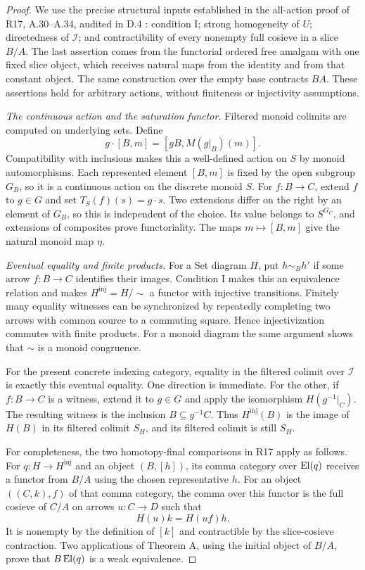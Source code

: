 \begin{proof}
We use the precise structural inputs established in the all-action
proof of R17, A.30--A.34, audited in D.4
\cite{FTOTEX2}: condition I; strong homogeneity of $U$; directedness
of $\mathcal I$; and contractibility of every nonempty full cosieve
in a slice $B/A$. The last assertion comes from the functorial
ordered free amalgam with one fixed slice object, which receives
natural maps from the identity and from that constant object.
The same construction over the empty base contracts $BA$.
These assertions hold for arbitrary actions, without finiteness or
injectivity assumptions.

\emph{The continuous action and the saturation functor.}
Filtered monoid colimits are computed on underlying sets. Define
\[
 g\cdot[B,m]=[gB,M(g|_B)(m)].
\]
Compatibility with inclusions makes this a well-defined action on
$S$ by monoid automorphisms. Each represented element $[B,m]$ is
fixed by the open subgroup $G_B$, so it is a continuous action on
the discrete monoid $S$. For $f:B\to C$, extend $f$ to $g\in G$
and set $T_S(f)(s)=g\cdot s$. Two extensions differ on the right
by an element of $G_B$, so this is independent of the choice.
Its value belongs to $S^{G_C}$, and extensions of composites prove
functoriality. The maps $m\mapsto[B,m]$ give the natural monoid
map $\eta$.

\emph{Eventual equality and finite products.}
For a Set diagram $H$, put $h\sim_B h'$ if some arrow $f:B\to C$
identifies their images. Condition I makes this an equivalence
relation and makes $H^{\mathrm{inj}}=H/{\sim}$ a functor with
injective transitions. Finitely many equality witnesses can be
synchronized by repeatedly completing two arrows with common source
to a commuting square. Hence injectivization commutes with finite
products. For a monoid diagram the same argument shows that $\sim$
is a monoid congruence.

For the present concrete indexing category, equality in the
filtered colimit over $\mathcal I$ is exactly this eventual
equality. One direction is immediate. For the other, if $f:B\to C$
is a witness, extend it to $g\in G$ and apply the isomorphism
$H(g^{-1}|_C)$. The resulting witness is the inclusion
$B\subseteq g^{-1}C$. Thus $H^{\mathrm{inj}}(B)$ is the image of
$H(B)$ in its filtered colimit $S_H$, and its filtered colimit
is still $S_H$.

For completeness, the two homotopy-final comparisons in R17 apply
as follows. For $q:H\to H^{\mathrm{inj}}$ and an object
$(B,[h])$, its comma category over $\operatorname{El}(q)$ receives a functor
from $B/A$ using the chosen representative $h$. For an object
$((C,k),f)$ of that comma category, the comma over this functor
is the full cosieve of $C/A$ on arrows $u:C\to D$ such that
\[
 H(u)k=H(uf)h.
\]
It is nonempty by the definition of $[k]$ and contractible by
the slice-cosieve contraction. Two applications of Theorem A,
using the initial object of $B/A$, prove that
$B\operatorname{El}(q)$ is a weak equivalence.


\end{proof}
